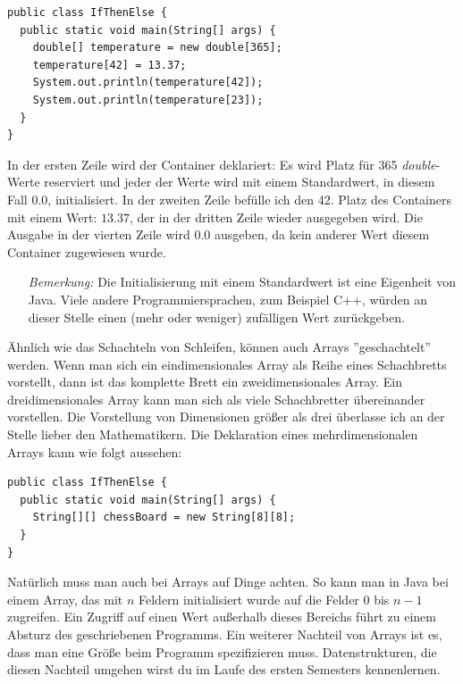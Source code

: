 \begin{minipage}{\textwidth}
\begin{lstlisting}
public class IfThenElse {
  public static void main(String[] args) {
    double[] temperature = new double[365];
    temperature[42] = 13.37;
    System.out.println(temperature[42]);
    System.out.println(temperature[23]);
  }
}
\end{lstlisting}	
\end{minipage}

In der ersten Zeile wird der Container deklariert: Es wird Platz für 365 \textit{double}-Werte reserviert und jeder der Werte wird mit einem Standardwert, in diesem Fall $0.0$, initialisiert. In der zweiten Zeile befülle ich den 42. Platz des Containers mit einem Wert: $13.37$, der in der dritten Zeile wieder ausgegeben wird. Die Ausgabe in der vierten Zeile wird $0.0$ ausgeben, da kein anderer Wert diesem Container zugewiesen wurde.

\begin{itemize}
	\item[\textit{Bemerkung:}] Die Initialisierung mit einem Standardwert ist eine Eigenheit von Java. Viele andere Programmiersprachen, zum Beispiel C++, würden an dieser Stelle einen (mehr oder weniger) zufälligen Wert zurückgeben.
\end{itemize}

Ähnlich wie das Schachteln von Schleifen, können auch Arrays ''geschachtelt'' werden. Wenn man sich ein eindimensionales Array als Reihe eines Schachbretts vorstellt, dann ist das komplette Brett ein zweidimensionales Array. Ein dreidimensionales Array kann man sich als viele Schachbretter übereinander vorstellen. Die Vorstellung von Dimensionen größer als drei überlasse ich an der Stelle lieber den Mathematikern. Die Deklaration eines mehrdimensionalen Arrays kann wie folgt aussehen:

\begin{minipage}{\textwidth}
\begin{lstlisting}
public class IfThenElse {
  public static void main(String[] args) {
    String[][] chessBoard = new String[8][8];
  }
}
\end{lstlisting}	
\end{minipage}

Natürlich muss man auch bei Arrays auf Dinge achten. So kann man in Java bei einem Array, das mit $n$ Feldern initialisiert wurde auf die Felder $0$ bis $n-1$ zugreifen. Ein Zugriff auf einen Wert außerhalb dieses Bereichs führt zu einem Absturz des geschriebenen Programms. Ein weiterer Nachteil von Arrays ist es, dass man eine Größe beim Programm spezifizieren muss. Datenstrukturen, die diesen Nachteil umgehen wirst du im Laufe des ersten Semesters kennenlernen.

